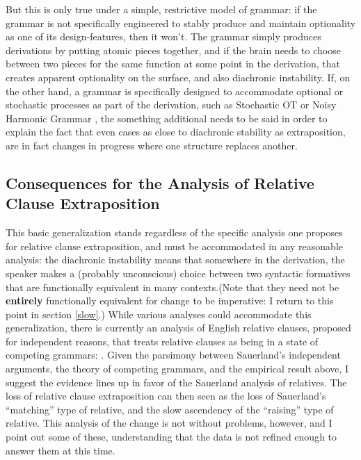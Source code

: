 But this is only true under a simple, restrictive model of grammar: if the grammar is not specifically engineered to stably produce and maintain optionality as one of its design-features, then it won't. The grammar simply produces derivations by putting atomic pieces together, and if the brain needs to choose between two pieces for the same function at some point in the derivation, that creates apparent optionality on the surface, and also diachronic instability. If, on the other hand, a grammar is specifically designed to accommodate optional or stochastic processes as part of the derivation, such as Stochastic OT \citep{boersmahayes2001} or Noisy Harmonic Grammar \citep[][and much subsequent work]{boersmapater2008, pater2008}, the something additional needs to be said in order to explain the fact that even cases as close to diachronic stability as extraposition, are in fact changes in progress where one structure replaces another.

\subsection{Consequences for the Analysis of Relative Clause Extraposition}

This basic generalization stands regardless of the specific analysis one proposes for relative clause extraposition, and must be accommodated in any reasonable analysis: the diachronic instability means that somewhere in the derivation, the speaker makes a (probably unconscious) choice between two syntactic formatives that are functionally equivalent in many contexts.(Note that they need not be \textbf{entirely} functionally equivalent for change to be imperative: I return to this point in section \ref{slow}.) While various analyses could accommodate this generalization, there is currently an analysis of English relative clauses, proposed for independent reasons, that treats relative clauses as being in a state of competing grammars: \citet{sauerland2003}. Given the parsimony between Sauerland's independent arguments, the theory of competing grammars, and the empirical result above, I suggest the evidence lines up in favor of the Sauerland analysis of relatives. The loss of relative clause extraposition can then seen as the loss of Sauerland's ``matching'' type of relative, and the slow ascendency of the ``raising'' type of relative. This analysis of the change is not without problems, however, and I point out some of these, understanding that the data is not refined enough to answer them at this time.

